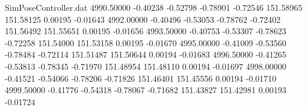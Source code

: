 \begin{filecontents}{SimPoseController.dat}
4990.50000   -0.40238   -0.52798    -0.78901   -0.72546  151.58965  151.58125    0.00195   -0.01643
4992.00000   -0.40496   -0.53053    -0.78762   -0.72402  151.56492  151.55651    0.00195   -0.01656
4993.50000   -0.40753   -0.53307    -0.78623   -0.72258  151.54000  151.53158    0.00195   -0.01670
4995.00000   -0.41009   -0.53560    -0.78484   -0.72114  151.51487  151.50644    0.00194   -0.01683
4996.50000   -0.41265   -0.53813    -0.78345   -0.71970  151.48954  151.48110    0.00194   -0.01697
4998.00000   -0.41521   -0.54066    -0.78206   -0.71826  151.46401  151.45556    0.00194   -0.01710
4999.50000   -0.41776   -0.54318    -0.78067   -0.71682  151.43827  151.42981    0.00193   -0.01724
\end{filecontents}
